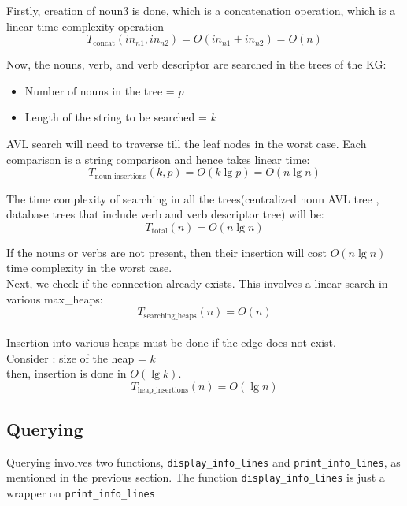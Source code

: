 \documentclass[conference]{IEEEtran}
\begin{document}
Firstly, creation of noun3 is done, which is a concatenation operation, which is a linear time complexity operation
\\
\begin{equation}
	T_{\text{concat}}(in_{n1}, in_{n2}) = O(in_{n1} + in_{n2}) = O(n)
\end{equation}

Now, the nouns, verb, and verb descriptor are searched in the trees of the KG:
\begin{itemize}
    \item Number of nouns in the tree = $p$
    \item Length of the string to be searched = $k$
\end{itemize}
AVL search will need to traverse till the leaf nodes in the worst case. Each comparison is a string comparison and hence takes linear time:
\begin{equation}
	T_{\text{noun\_insertions}}(k, p) = O(k \lg p) = O(n \lg n)
\end{equation}


The time complexity of searching in all the trees(centralized noun AVL tree , database trees that include verb and verb descriptor tree) will be:
\begin{equation}
	T_{\text{total}}(n) = O(n \lg n)
\end{equation}

If the nouns or verbs are not present, then their insertion  will cost $O(n \lg n)$ time complexity in the worst case.
\\
Next, we check if the connection already exists. This involves a linear search in various max\_heaps:
\begin{equation}
	T_{\text{searching\_heaps}}(n) = O(n)
\end{equation}
\\
Insertion into various heaps must be done if the edge does not exist. \\Consider : size of the heap = $k$
\\then, insertion is done in $O(\lg k)$.
\\
\begin{equation}
	T_{\text{heap\_insertions}}(n) = O(\lg n)
\end{equation}


\subsection{Querying}
Querying involves two functions, \texttt{display\_info\_lines} and
\texttt{print\_info\_lines}, as mentioned in the previous section.
The function \texttt{display\_info\_lines} is just a wrapper on
\texttt{print\_info\_lines}
\end{document}
